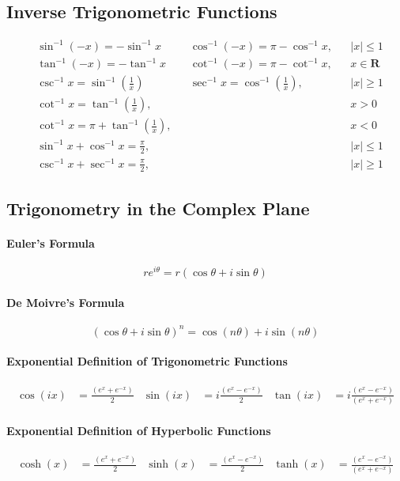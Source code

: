 \documentclass[12pt]{article}
\begin{document}
\subsection{Inverse Trigonometric Functions}
\begin{align*}
	&\sin^{-1}(-x) =-\sin^{-1}x &   &\cos^{-1}(-x) =\pi-\cos^{-1}x, & &\lvert x\rvert\leq 1 \\
	&\tan^{-1}(-x) =-\tan^{-1}x &   &\cot^{-1}(-x) =\pi-\cot^{-1}x,& &x\in\mathbf{R} \\ 
	&\csc^{-1}x =\sin^{-1}\left(\frac{1}{x}\right) & &\sec^{-1}x =\cos^{-1}\left(\frac{1}{x}\right),& &\lvert x\rvert\geq1 \\ &\cot^{-1}x =\tan^{-1}\left(\frac{1}{x}\right),& & & &x>0 \\ 
	&\cot^{-1}x =\pi+\tan^{-1}\left(\frac{1}{x}\right),& & & &x<0 \\ 
	&\sin^{-1}x+\cos^{-1}x =\frac{\pi}{2},& & &  &\lvert x\rvert\leq1 \\ 
	&\csc^{-1}x+\sec^{-1}x =\frac{\pi}{2},& & & &\lvert x\rvert\geq1 
\end{align*}



\subsection{Trigonometry in the Complex Plane}
\paragraph{Euler's Formula}
$$re^{i\theta} = r(\cos\theta + i\sin\theta)$$
\paragraph{De Moivre's Formula}
$${(\cos\theta + i\sin\theta)}^n = \cos{(n\theta)} + i\sin{(n\theta)}$$
\paragraph{Exponential Definition of Trigonometric Functions}
\begin{align*}
\cos{(ix)} &= \frac{(e^x + e^{-x})}{2} & \sin{(ix)} &= i\frac{(e^x - e^{-x})}{2} & \tan{(ix)} &= i\frac{(e^x - e^{-x})}{(e^x + e^{-x})}
\end{align*}
\paragraph{Exponential Definition of Hyperbolic Functions}
\begin{align*}
\cosh{(x)} &= \frac{(e^x + e^{-x})}{2} & \sinh{(x)} &= \frac{(e^x - e^{-x})}{2} & \tanh{(x)} &= \frac{(e^x - e^{-x})}{(e^x + e^{-x})}
\end{align*}
\end{document}
